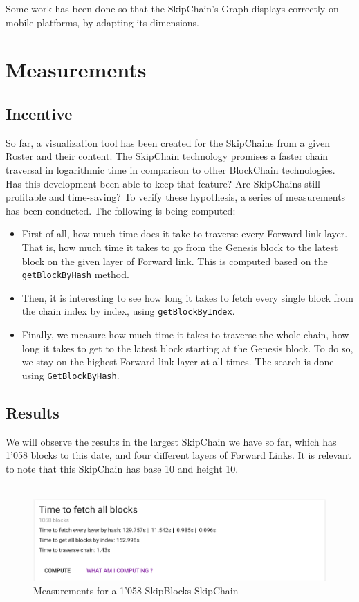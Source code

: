 \documentclass[11pt, a4paper, twoside, openright]{article} %
\begin{document}
{Some work has been done so that the SkipChain's Graph displays correctly on mobile platforms, by adapting its dimensions.

\newpage
\section{Measurements}
\subsection{Incentive}
So far, a visualization tool has been created for the SkipChains from a given Roster and their content. The SkipChain technology promises a faster chain traversal in logarithmic time in comparison to other BlockChain technologies.
Has this development been able to keep that feature? Are SkipChains still profitable and time-saving? To verify these hypothesis, a series of measurements has been conducted. The following is being computed:
\begin{itemize}
\item First of all, how much time does it take to traverse every Forward link layer. That is, how much time it takes to go from the Genesis block to the latest block on the given layer of Forward link. This is computed based on the \verb|getBlockByHash| method.
\item Then, it is interesting to see how long it takes to fetch every single block from the chain index by index, using \verb|getBlockByIndex|.
\item Finally, we measure how much time it takes to traverse the whole chain, how long it takes to get to the latest block starting at the Genesis block. To do so, we stay on the highest Forward link layer at all times. The search is done using \verb|GetBlockByHash|.
\end{itemize}
\subsection{Results}
We will observe the results in the largest SkipChain we have so far, which has 1'058 blocks to this date, and four different layers of Forward Links. It is relevant to note that this SkipChain has base 10 and height 10.
\\\\
\begin{figure}[h]
    \centering
    \includegraphics[width=\textwidth]{Measurements1058.png}
    \caption{Measurements for a 1'058 SkipBlocks SkipChain}
    \label{fig:Figure12}
\end{figure}

}
\end{document}
